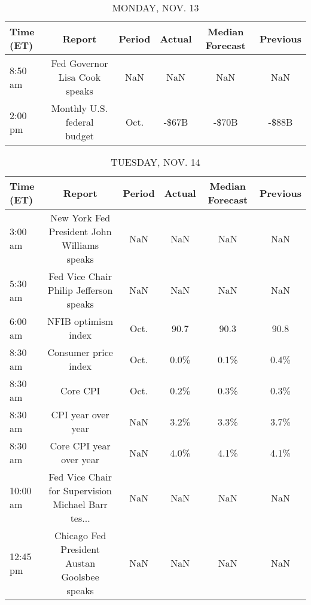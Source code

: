 \documentclass{article}%
\begin{document}
%
\normalsize%


\begin{table}[htbp]%
\caption{MONDAY, NOV. 13}%
\centering%
\begin{adjustbox}{width=1\textwidth}%
\begin{tabular}{lccccc}
\toprule
Time (ET) &                        Report & Period & Actual & Median Forecast & Previous \\
\midrule
  8:50 am & Fed Governor Lisa Cook speaks &    NaN &    NaN &             NaN &      NaN \\
  2:00 pm &   Monthly U.S. federal budget &   Oct. &  -\$67B &           -\$70B &    -\$88B \\
\bottomrule
\end{tabular}
%
\end{adjustbox}%
\end{table}

%


\begin{table}[htbp]%
\caption{TUESDAY, NOV. 14}%
\centering%
\begin{adjustbox}{width=1\textwidth}%
\begin{tabular}{lccccc}
\toprule
Time (ET) &                                             Report & Period & Actual & Median Forecast & Previous \\
\midrule
  3:00 am &        New York Fed President John Williams speaks &    NaN &    NaN &             NaN &      NaN \\
  5:30 am &             Fed Vice Chair Philip Jefferson speaks &    NaN &    NaN &             NaN &      NaN \\
  6:00 am &                                NFIB optimism index &   Oct. &   90.7 &            90.3 &     90.8 \\
  8:30 am &                               Consumer price index &   Oct. &   0.0\% &            0.1\% &     0.4\% \\
  8:30 am &                                           Core CPI &   Oct. &   0.2\% &            0.3\% &     0.3\% \\
  8:30 am &                                 CPI year over year &    NaN &   3.2\% &            3.3\% &     3.7\% \\
  8:30 am &                            Core CPI year over year &    NaN &   4.0\% &            4.1\% &     4.1\% \\
 10:00 am & Fed Vice Chair for Supervision Michael Barr tes... &    NaN &    NaN &             NaN &      NaN \\
 12:45 pm &       Chicago Fed President Austan Goolsbee speaks &    NaN &    NaN &             NaN &      NaN \\
\bottomrule
\end{tabular}
%
\end{adjustbox}%
\end{table}
\end{document}
